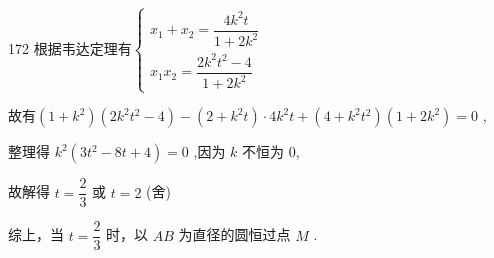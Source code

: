 \begin{enumerate}
\begin{jieda}
\begin{enumerate}
\begin{dingautolist}{172}
                根据韦达定理有$\left\{\begin{array}{l}
                        {x}_{1} + {x}_{2} = \dfrac{4{k}^{2}t}{1 + 2{k}^{2}}  \\
                        {x}_{1}{x}_{2} = \dfrac{2{k}^{2}{t}^{2} - 4}{1 + 2{k}^{2}}
                \end{array}\right.$
                
                故有$\left( {1 + {k}^{2}}\right) \left( {2{k}^{2}{t}^{2} - 4}\right)  - \left( {2 + {k}^{2}t}\right)  \cdot  4{k}^{2}t + \left( {4 + {k}^{2}{t}^{2}}\right) \left( {1 + 2{k}^{2}}\right)  = 0$ ,
                
                整理得 ${k}^{2}\left( {3{t}^{2} - {8t} + 4}\right)  = 0$ ,因为 $k$ 不恒为 0,
                
                故解得 $t = \dfrac{2}{3}$ 或 $t = 2$ (舍)
            \end{dingautolist}
            综上，当 $t = \dfrac{2}{3}$ 时，以 ${AB}$ 为直径的圆恒过点 $M$ .
        \end{enumerate}
    \end{jieda}
\end{enumerate}

